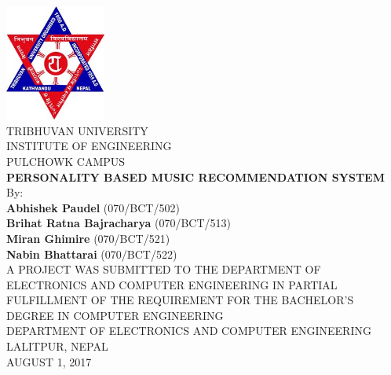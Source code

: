 

\thispagestyle{empty} %



{
  \thispagestyle{empty}
  \centering
  \normalsize
  
  \includegraphics[width=1.3in]{fig/tu-logo}\\
  {TRIBHUVAN UNIVERSITY}\\
  {INSTITUTE OF ENGINEERING}\\
  PULCHOWK CAMPUS
  \\[1.5cm]

  {\bf PERSONALITY BASED MUSIC RECOMMENDATION SYSTEM}\\[1.5cm]

  By:\\
  {\bf Abhishek Paudel} (070/BCT/502)\\
  {\bf Brihat Ratna Bajracharya} (070/BCT/513)\\
  {\bf Miran Ghimire} (070/BCT/521)\\
  {\bf Nabin Bhattarai} (070/BCT/522)\\[1.5cm]

  A PROJECT WAS SUBMITTED TO THE DEPARTMENT OF ELECTRONICS AND COMPUTER
  ENGINEERING IN PARTIAL FULFILLMENT OF THE REQUIREMENT FOR THE BACHELOR'S
  DEGREE IN COMPUTER ENGINEERING\\[1.5cm]

  DEPARTMENT OF ELECTRONICS AND COMPUTER ENGINEERING\\
  LALITPUR, NEPAL\\[3.5cm]


  AUGUST 1, 2017

}

